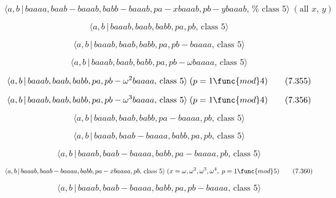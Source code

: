 \documentclass[10pt]{article}
\begin{document}
\begin{equation}
\langle a,b\,|\,baaaa,baab-baaab,babb-baaab,pa-xbaaab,pb-ybaaab,\,\text{%
class }5\rangle \;(\text{all }x,\,y)  \tag{7.351}
\end{equation}

\begin{equation}
\langle a,b\,|\,baaab,baab,babb,pa,pb,\,\text{class }5\rangle  \tag{7.352}
\end{equation}

\begin{equation}
\langle a,b\,|\,baaab,baab,babb,pa,pb-baaaa,\,\text{class }5\rangle 
\tag{7.353}
\end{equation}

\begin{equation}
\langle a,b\,|\,baaab,baab,babb,pa,pb-\omega baaaa,\,\text{class }5\rangle 
\tag{7.354}
\end{equation}

\begin{equation}
\langle a,b\,|\,baaab,baab,babb,pa,pb-\omega ^{2}baaaa,\,\text{class }%
5\rangle \;(p=1\func{mod}4)  \tag{7.355}
\end{equation}

\begin{equation}
\langle a,b\,|\,baaab,baab,babb,pa,pb-\omega ^{3}baaaa,\,\text{class }%
5\rangle \;(p=1\func{mod}4)  \tag{7.356}
\end{equation}

\begin{equation}
\langle a,b\,|\,baaab,baab,babb,pa-baaaa,pb,\,\text{class }5\rangle 
\tag{7.357}
\end{equation}

\begin{equation}
\langle a,b\,|\,baaab,baab-baaaa,babb,pa,pb,\,\text{class }5\rangle 
\tag{7.358}
\end{equation}

\begin{equation}
\langle a,b\,|\,baaab,baab-baaaa,babb,pa-baaaa,pb,\,\text{class }5\rangle 
\tag{7.359}
\end{equation}

\begin{equation}
\langle a,b\,|\,baaab,baab-baaaa,babb,pa-xbaaaa,pb,\,\text{class }5\rangle
\;(x=\omega ,\omega ^{2},\omega ^{3},\omega ^{4},\;p=1\func{mod}5) 
\tag{7.360}
\end{equation}

\begin{equation}
\langle a,b\,|\,baaab,baab-baaaa,babb,pa,pb-baaaa,\,\text{class }5\rangle 
\tag{7.361}
\end{equation}
\end{document}
